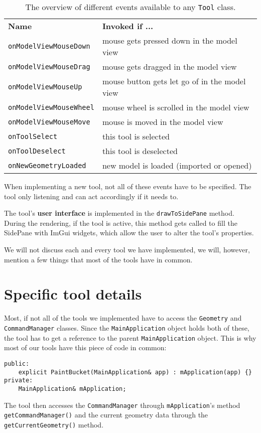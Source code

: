\begin{table}[H]
\centering
\begin{tabular}{ll}
\textbf{Name}         & \textbf{Invoked if ...}                       \\
\texttt{onModelViewMouseDown}  & mouse gets pressed down in the model view     \\
\texttt{onModelViewMouseDrag}  & mouse gets dragged in the model view          \\
\texttt{onModelViewMouseUp}    & mouse button gets let go of in the model view \\
\texttt{onModelViewMouseWheel} & mouse wheel is scrolled in the model view     \\
\texttt{onModelViewMouseMove}  & mouse is moved in the model view              \\
\texttt{onToolSelect}          & this tool is selected                         \\
\texttt{onToolDeselect}        & this tool is deselected                       \\
\texttt{onNewGeometryLoaded}   & new model is loaded (imported or opened)
\end{tabular}
\label{tab:events}
\caption{The overview of different events available to any \texttt{Tool} class.}
\end{table}

When implementing a new tool, not all of these events have to be specified. The tool only listening and can act accordingly if it needs to.

The tool's \textbf{user interface} is implemented in the \texttt{drawToSidePane} method. During the rendering, if the tool is active, this method gets called to fill the SidePane with ImGui widgets, which allow the user to alter the tool's properties.

We will not discuss each and every tool we have implemented, we will, however, mention a few things that most of the tools have in common.

\section{Specific tool details}

Most, if not all of the tools we implemented have to access the \texttt{Geometry} and \texttt{CommandManager} classes. Since the \texttt{MainApplication} object holds both of these, the tool has to get a reference to the parent \texttt{MainApplication} object. This is why most of our tools have this piece of code in common:

\begin{lstlisting}
public:
	explicit PaintBucket(MainApplication& app) : mApplication(app) {}
private:
	MainApplication& mApplication;
\end{lstlisting}

The tool then accesses the \texttt{CommandManager} through \texttt{mApplication}'s method \texttt{getCommandManager()} and the current geometry data through the \texttt{getCurrentGeometry()} method.